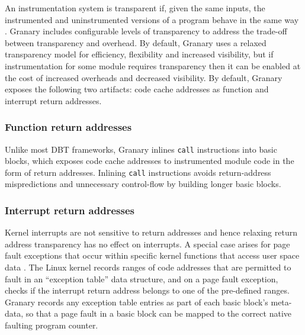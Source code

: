 \documentclass[preprint]{sigplanconf}
\begin{document}
An instrumentation system is transparent if, given the same inputs, the instrumented and uninstrumented versions of a program behave in the same way \cite{Transparency}. Granary includes configurable levels of transparency to address the trade-off between transparency and overhead. By default, Granary uses a relaxed transparency model for efficiency, flexibility and increased visibility, but if instrumentation for some module requires transparency then it can be enabled at the cost of increased overheads and decreased visibility. By default, Granary exposes the following two artifacts: code cache addresses as function and interrupt return addresses.

\subsubsection{Function return addresses}\label{para:return_address_transparency} Unlike most DBT frameworks, Granary inlines \texttt{call} instructions into basic blocks, which exposes code cache addresses to instrumented module code in the form of return addresses. Inlining \texttt{call} instructions avoids return-address mispredictions and unnecessary control-flow by building longer basic blocks. 

\subsubsection{Interrupt return addresses} Kernel interrupts are not sensitive to return addresses and hence relaxing return address transparency has no effect on interrupts. A special case arises for page fault exceptions that occur within specific kernel functions that access user space data \cite{btkernel}. The Linux kernel records ranges of code addresses that are permitted to fault in an ``exception table'' data structure, and on a page fault exception, checks if the interrupt return address belongs to one of the pre-defined ranges. Granary records any exception table entries as part of each basic block's meta-data, so that a page fault in a basic block can be mapped to the correct native faulting program counter.

\end{document}

